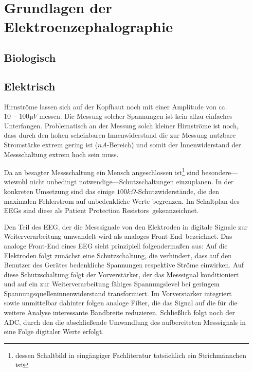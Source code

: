\documentclass[12pt,a4paper,notitlepage]{article}
\begin{document}
\section{Grundlagen der Elektroenzephalographie}
\subsection{Biologisch}
\subsection{Elektrisch}
Hirnströme lassen sich auf der Kopfhaut noch mit einer Amplitude von ca.\ $10-100µV$ messen\cite{MAYER1}. Die Messung solcher Spannungen ist kein allzu einfaches Unterfangen. Problematisch an der Messung solch kleiner Hirnströme ist noch, dass durch den hohen scheinbaren Innenwiderstand die zur Messung nutzbare Stromstärke extrem gering ist ($nA$-Bereich) und somit der Innenwiderstand der Messschaltung extrem hoch sein muss.

Da an besagter Messschaltung ein Mensch angeschlossen ist\footnote{dessen Schaltbild in eingängiger Fachliteratur tatsächlich ein Strichmännchen ist} sind besondere---wiewohl nicht unbedingt notwendige---Schutzschaltungen einzuplanen. In der konkreten Umsetzung sind das einige $100k\Omega$-Schutzwiderstände, die den maximalen \gls{Fehlerstrom} auf unbedenkliche Werte begrenzen. Im Schaltplan des EEGs sind diese als \glqq Patient Protection Resistors\grqq\ gekennzeichnet.

Den Teil des \gls{EEG}, der die Messsignale von den Elektroden in digitale Signale zur Weiterverarbeitung umwandelt wird als \glqq analoges Front-End\grqq\ bezeichnet. Das analoge Front-End eines \gls{EEG} sieht prinzipiell folgendermaßen aus: Auf die Elektroden folgt zunächst eine Schutzschaltung, die verhindert, dass auf den Benutzer des Gerätes bedenkliche Spannungen respektive Ströme einwirken. Auf diese Schutzschaltung folgt der Vorverstärker, der das Messsignal konditioniert und auf ein zur Weiterverarbeitung fähiges Spannungslevel bei geringem Spannungsquelleninnenwiderstand transformiert. Im Vorverstärker integriert sowie unmittelbar dahinter folgen analoge Filter, die das Signal auf die für die weitere Analyse interessante Bandbreite reduzieren. Schließlich folgt noch der \gls{ADC}, durch den die abschließende Umwandlung des aufbereiteten Messsignals in eine Folge digitaler Werte erfolgt.
\end{document}
